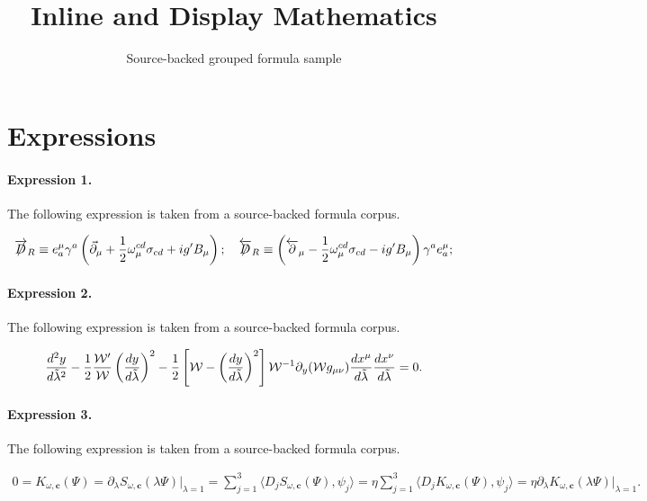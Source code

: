 \documentclass[11pt]{article}
\title{Inline and Display Mathematics}
\author{Source-backed grouped formula sample}
\date{}
\begin{document}
\maketitle
\section{Expressions}
\paragraph{Expression 1.} The following expression is taken from a source-backed formula corpus.

\begin{align*}\overrightarrow{\not\!\!D}_{R}\equiv e^{\mu}_{a}\gamma^{a}\left(\vec{\partial}_{\mu}+\frac{1}{2}\omega_{\mu}^{cd}\sigma_{cd}+ig^{\prime}B_{\mu}\right); \quad\overleftarrow{\not\!\!D}_{R}\equiv\left(\overleftarrow{\partial}_{\mu}-\frac{1}{2}\omega_{\mu}^{cd}\sigma_{cd}-ig^{\prime}B_{\mu}\right)\gamma^{a}e_{a}^{\mu};\end{align*}

\paragraph{Expression 2.} The following expression is taken from a source-backed formula corpus.

\begin{align*}{{d^2y}\over{d\tilde{\lambda}^2}}-{1\over 2}{{{\cal W}^{\prime}}\over{\cal W}}\left({{dy}\over{d\tilde{\lambda}}}\right)^2-{1\over 2}\left[{\cal W}-\left({{dy}\over{d\tilde{\lambda}}}\right)^2\right]{\cal W}^{-1}\partial_y({\cal W}g_{\mu\nu}){{dx^{\mu}}\over{d\tilde{\lambda}}}{{dx^{\nu}}\over{d\tilde{\lambda}}}=0.\end{align*}

\paragraph{Expression 3.} The following expression is taken from a source-backed formula corpus.

\begin{align*}0=K_{\omega,\mathbf{c}}(\Psi)=\partial_{\lambda}S_{\omega,\mathbf{c}}(\lambda \Psi)\big|_{\lambda =1}=\sum_{j=1}^3\langle D_jS_{\omega,\mathbf{c}}(\Psi),\psi_j\rangle=\eta \sum_{j=1}^3\langle D_jK_{\omega,\mathbf{c}}(\Psi),\psi_j\rangle=\eta \partial_{\lambda}K_{\omega,\mathbf{c}}(\lambda \Psi)\big|_{\lambda =1}. \end{align*}
\end{document}
